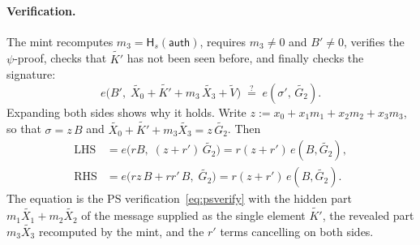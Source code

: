 \documentclass[10pt,a5paper]{article}
\newcommand{\K}[1]{#1}                      %
\newcommand{\Go}[1]{#1}                     %
\newcommand{\Gt}[1]{\tilde{#1}}             %
\newcommand{\GT}[1]{#1}                     %
\newcommand{\K}[1]{{\color{ScalarCol}#1}}   %
\newcommand{\Go}[1]{{\color{GoneCol}#1}}    %
\newcommand{\Gt}[1]{{\color{GtwoCol}#1}}    %
\newcommand{\GT}[1]{{\color{GtCol}#1}}      %
\newcommand{\Hs}{\mathsf{H}_{s}}
\newcommand{\auth}{\mathsf{auth}}
\newcommand{\eqq}{\stackrel{?}{=}}
\begin{document}
\paragraph{Verification.}
The mint recomputes $\K{m_3} = \Hs(\auth)$, requires $\K{m_3} \neq 0$ and
$\Go{B'} \neq 0$, verifies the $\psi$-proof, checks that $\Gt{K'}$ has not been
seen before, and finally checks the signature:
\begin{equation}
  e\bigl(\Go{B'},\; \Gt{X_0} + \Gt{K'} + \K{m_3}\,\Gt{X_3} + \Gt{V}\bigr) \;\eqq\; e(\Go{\sigma'},\, \Gt{G_2}).
  \label{eq:spendverify}
\end{equation}
Expanding both sides shows why it holds. Write
$\K{z} := \K{x_0} + \K{x_1}\K{m_1} + \K{x_2}\K{m_2} + \K{x_3}\K{m_3}$, so that
$\Go{\sigma} = \K{z}\,\Go{B}$ and
$\Gt{X_0} + \Gt{K'} + \K{m_3}\Gt{X_3} = \K{z}\,\Gt{G_2}$. Then
\begin{align*}
  \text{LHS} &= e\bigl(\K{r}\Go{B},\; (\K{z} + \K{r'})\,\Gt{G_2}\bigr)
             = \K{r}(\K{z}+\K{r'})\,\GT{e(\Go{B},\Gt{G_2})}, \\
  \text{RHS} &= e\bigl(\K{r}\K{z}\,\Go{B} + \K{r}\K{r'}\,\Go{B},\; \Gt{G_2}\bigr)
             = \K{r}(\K{z}+\K{r'})\,\GT{e(\Go{B},\Gt{G_2})}.
\end{align*}
The equation is the PS verification~\eqref{eq:psverify} with the hidden part
$\K{m_1}\Gt{X_1} + \K{m_2}\Gt{X_2}$ of the message supplied as the single
element $\Gt{K'}$, the revealed part $\K{m_3}\Gt{X_3}$ recomputed by the mint,
and the $\K{r'}$ terms cancelling on both sides.
\end{document}
